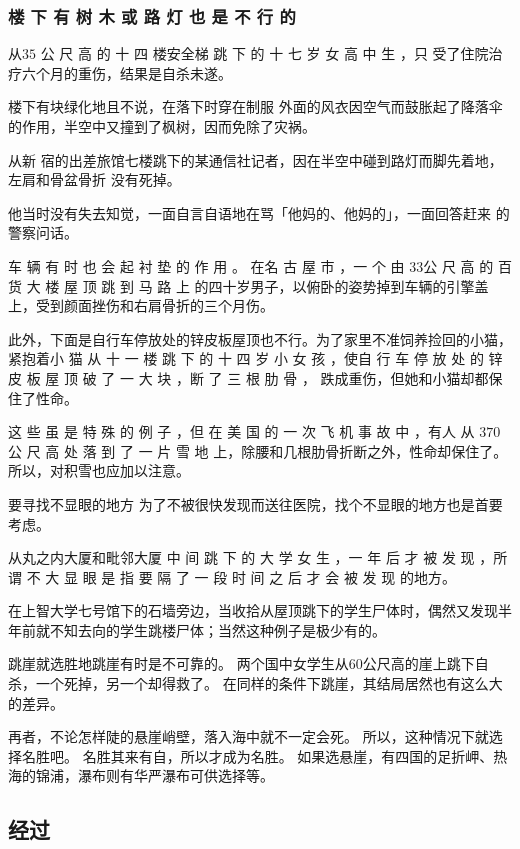 \documentclass[UTF8]{ctexart}
\begin{document}
\subsubsection*{楼 下 有 树 木 或 路 灯 也 是 不 行 的}

从$35$ 公 尺 高 的 十 四 楼安全梯 跳 下 的 十 七 岁 女 高 中 生 ，只 受了住院治疗六个月的重伤，结果是自杀未遂。

楼下有块绿化地且不说，在落下时穿在制服 外面的风衣因空气而鼓胀起了降落伞的作用，半空中又撞到了枫树，因而免除了灾祸。

从新 宿的出差旅馆七楼跳下的某通信社记者，因在半空中碰到路灯而脚先着地，左肩和骨盆骨折 没有死掉。

他当时没有失去知觉，一面自言自语地在骂「他妈的、他妈的」，一面回答赶来 的警察问话。

车 辆 有 时 也 会 起 衬 垫 的 作 用 。
在名 古 屋 市 ，一 个 由 $33$公 尺 高 的 百 货 大 楼 屋 顶 跳 到 马 路 上 的四十岁男子，以俯卧的姿势掉到车辆的引擎盖上，受到颜面挫伤和右肩骨折的三个月伤。

此外，下面是自行车停放处的锌皮板屋顶也不行。为了家里不准饲养捡回的小猫，紧抱着小 猫 从 十 一 楼 跳 下 的 十 四 岁 小 女 孩 ，使自 行 车 停 放 处 的 锌 皮 板 屋 顶 破 了 一 大 块 ，断 了 三 根 肋 骨 ， 跌成重伤，但她和小猫却都保住了性命。

这 些 虽 是 特 殊 的 例 子 ，但 在 美 国 的 一 次 飞 机 事 故 中 ，有人 从 $370$公 尺 高 处 落 到 了 一 片 雪 地 上，除腰和几根肋骨折断之外，性命却保住了。所以，对积雪也应加以注意。

要寻找不显眼的地方 为了不被很快发现而送往医院，找个不显眼的地方也是首要考虑。

从丸之内大厦和毗邻大厦 中 间 跳 下 的 大 学 女 生 ，一 年 后 才 被 发 现 ，所谓 不 大 显 眼 是 指 要 隔 了 一 段 时 间 之 后 才 会 被 发 现 的地方。

在上智大学七号馆下的石墙旁边，当收拾从屋顶跳下的学生尸体时，偶然又发现半 年前就不知去向的学生跳楼尸体；当然这种例子是极少有的。

跳崖就选胜地跳崖有时是不可靠的。
两个国中女学生从$60$公尺高的崖上跳下自杀，一个死掉，另一个却得救了。
在同样的条件下跳崖，其结局居然也有这么大的差异。

再者，不论怎样陡的悬崖峭壁，落入海中就不一定会死。
所以，这种情况下就选择名胜吧。
名胜其来有自，所以才成为名胜。
如果选悬崖，有四国的足折岬、热海的锦浦，瀑布则有华严瀑布可供选择等。

\subsection{经过}
\end{document}
